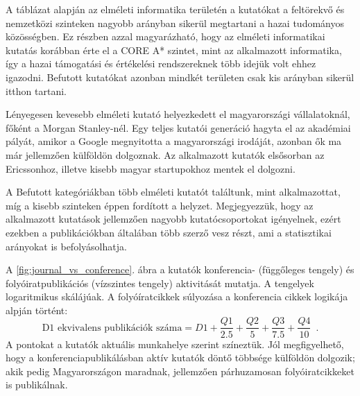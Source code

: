 \documentclass[12pt,a4paper]{article}
\begin{document}


%
%
%

A táblázat alapján az elméleti informatika területén a kutatókat a feltörekvő és nemzetközi szinteken nagyobb arányban sikerül megtartani a hazai tudományos közösségben. Ez részben azzal magyarázható, hogy az elméleti informatikai kutatás korábban érte el a CORE A\!* szintet, mint az alkalmazott informatika, így a hazai támogatási és értékelési rendszereknek több idejük volt ehhez igazodni. Befutott kutatókat azonban mindkét területen csak kis arányban sikerül itthon tartani.

Lényegesen kevesebb elméleti kutató helyezkedett el magyarországi vállalatoknál, főként a Morgan Stanley-nél. Egy teljes kutatói generáció hagyta el az akadémiai pályát, amikor a Google megnyitotta a magyarországi irodáját, azonban ők ma már jellemzően külföldön dolgoznak. Az alkalmazott kutatók elsősorban az Ericssonhoz, illetve kisebb magyar startupokhoz mentek el dolgozni. 

A Befutott kategóriákban több elméleti kutatót találtunk, mint alkalmazottat, míg a kisebb szinteken éppen fordított a helyzet. Megjegyezzük, hogy az alkalmazott kutatások jellemzően nagyobb kutatócsoportokat igényelnek, ezért ezekben a publikációkban általában több szerző vesz részt, ami a statisztikai arányokat is befolyásolhatja.

A \ref{fig:journal_vs_conference}. ábra a kutatók konferencia- (függőleges tengely) és folyóiratpublikációs (vízszintes tengely) aktivitását mutatja. A tengelyek logaritmikus skálájúak. A folyóíratcikkek súlyozása a konferencia cikkek logikája alpján történt:
\begin{equation}
\textrm{D1\ ekvivalens\ publikációk\ száma} = D1 + \frac{Q1}{2.5} + \frac{Q2}{5} + \frac{Q3}{7.5} + \frac{Q4}{10} \enspace.
\label{eq:weights2}
\end{equation}
A pontokat a kutatók aktuális munkahelye szerint színeztük. Jól megfigyelhető, hogy a konferenciapublikálásban aktív kutatók döntő többsége külföldön dolgozik; akik pedig Magyarországon maradnak, jellemzően párhuzamosan folyóiratcikkeket is publikálnak.
 
\end{document}
